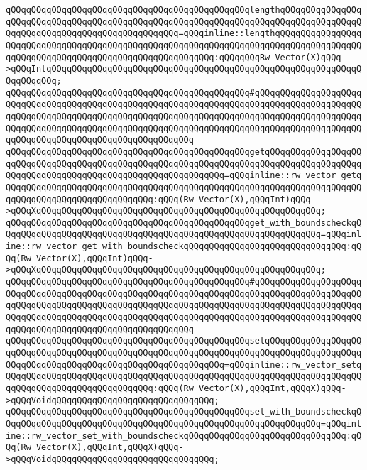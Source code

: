 \verb|qQQqqQQqqQQqqQQqqQQqqQQqqQQqqQQqqQQqqQQqqQQqqQQqlengthqQQqqQQqqQQqqQQqqQQqqQQqqQQqqQQqqQQqqQQqqQQqqQQqqQQqqQQqqQQqqQQqqQQqqQQqqQQqqQQqqQQqqQQqqQQqqQQqqQQqqQQqqQQqqQQqqQQqqQQq=qQQqinline::lengthqQQqqQQqqQQqqQQqqQQqqQQqqQQqqQQqqQQqqQQqqQQqqQQqqQQqqQQqqQQqqQQqqQQqqQQqqQQqqQQqqQQqqQQqqQQqqQQqqQQqqQQqqQQqqQQqqQQqqQQqqQQqqQQq:qQQqqQQqRw_Vector(X)qQQq->qQQqIntqQQqqQQqqQQqqQQqqQQqqQQqqQQqqQQqqQQqqQQqqQQqqQQqqQQqqQQqqQQqqQQqqQQqqQQq;|\newline
\verb|qQQqqQQqqQQqqQQqqQQqqQQqqQQqqQQqqQQqqQQqqQQqqQQq#qQQqqQQqqQQqqQQqqQQqqQQqqQQqqQQqqQQqqQQqqQQqqQQqqQQqqQQqqQQqqQQqqQQqqQQqqQQqqQQqqQQqqQQqqQQqqQQqqQQqqQQqqQQqqQQqqQQqqQQqqQQqqQQqqQQqqQQqqQQqqQQqqQQqqQQqqQQqqQQqqQQqqQQqqQQqqQQqqQQqqQQqqQQqqQQqqQQqqQQqqQQqqQQqqQQqqQQqqQQqqQQqqQQqqQQqqQQqqQQqqQQqqQQqqQQqqQQqqQQqqQQqqQQq|\newline
\verb|qQQqqQQqqQQqqQQqqQQqqQQqqQQqqQQqqQQqqQQqqQQqqQQqgetqQQqqQQqqQQqqQQqqQQqqQQqqQQqqQQqqQQqqQQqqQQqqQQqqQQqqQQqqQQqqQQqqQQqqQQqqQQqqQQqqQQqqQQqqQQqqQQqqQQqqQQqqQQqqQQqqQQqqQQqqQQqqQQqqQQq=qQQqinline::rw_vector_getqQQqqQQqqQQqqQQqqQQqqQQqqQQqqQQqqQQqqQQqqQQqqQQqqQQqqQQqqQQqqQQqqQQqqQQqqQQqqQQqqQQqqQQqqQQqqQQqqQQq:qQQq(Rw_Vector(X),qQQqInt)qQQq->qQQqXqQQqqQQqqQQqqQQqqQQqqQQqqQQqqQQqqQQqqQQqqQQqqQQqqQQqqQQq;|\newline
\verb|qQQqqQQqqQQqqQQqqQQqqQQqqQQqqQQqqQQqqQQqqQQqqQQqget_with_boundscheckqQQqqQQqqQQqqQQqqQQqqQQqqQQqqQQqqQQqqQQqqQQqqQQqqQQqqQQqqQQqqQQq=qQQqinline::rw_vector_get_with_boundscheckqQQqqQQqqQQqqQQqqQQqqQQqqQQqqQQq:qQQq(Rw_Vector(X),qQQqInt)qQQq->qQQqXqQQqqQQqqQQqqQQqqQQqqQQqqQQqqQQqqQQqqQQqqQQqqQQqqQQqqQQq;|\newline
\verb|qQQqqQQqqQQqqQQqqQQqqQQqqQQqqQQqqQQqqQQqqQQqqQQq#qQQqqQQqqQQqqQQqqQQqqQQqqQQqqQQqqQQqqQQqqQQqqQQqqQQqqQQqqQQqqQQqqQQqqQQqqQQqqQQqqQQqqQQqqQQqqQQqqQQqqQQqqQQqqQQqqQQqqQQqqQQqqQQqqQQqqQQqqQQqqQQqqQQqqQQqqQQqqQQqqQQqqQQqqQQqqQQqqQQqqQQqqQQqqQQqqQQqqQQqqQQqqQQqqQQqqQQqqQQqqQQqqQQqqQQqqQQqqQQqqQQqqQQqqQQqqQQqqQQqqQQqqQQq|\newline
\verb|qQQqqQQqqQQqqQQqqQQqqQQqqQQqqQQqqQQqqQQqqQQqqQQqsetqQQqqQQqqQQqqQQqqQQqqQQqqQQqqQQqqQQqqQQqqQQqqQQqqQQqqQQqqQQqqQQqqQQqqQQqqQQqqQQqqQQqqQQqqQQqqQQqqQQqqQQqqQQqqQQqqQQqqQQqqQQqqQQqqQQq=qQQqinline::rw_vector_setqQQqqQQqqQQqqQQqqQQqqQQqqQQqqQQqqQQqqQQqqQQqqQQqqQQqqQQqqQQqqQQqqQQqqQQqqQQqqQQqqQQqqQQqqQQqqQQqqQQq:qQQq(Rw_Vector(X),qQQqInt,qQQqX)qQQq->qQQqVoidqQQqqQQqqQQqqQQqqQQqqQQqqQQqqQQq;|\newline
\verb|qQQqqQQqqQQqqQQqqQQqqQQqqQQqqQQqqQQqqQQqqQQqqQQqset_with_boundscheckqQQqqQQqqQQqqQQqqQQqqQQqqQQqqQQqqQQqqQQqqQQqqQQqqQQqqQQqqQQqqQQq=qQQqinline::rw_vector_set_with_boundscheckqQQqqQQqqQQqqQQqqQQqqQQqqQQqqQQq:qQQq(Rw_Vector(X),qQQqInt,qQQqX)qQQq->qQQqVoidqQQqqQQqqQQqqQQqqQQqqQQqqQQqqQQq;|\newline
